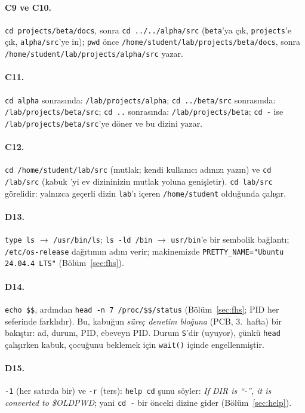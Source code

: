 \documentclass[11pt,a4paper]{article}
\newcommand{\cmd}[1]{\texttt{#1}}
\begin{document}
\paragraph{C9 ve C10.} \cmd{cd projects/beta/docs}, sonra \cmd{cd ../../alpha/src} (\texttt{beta}'ya çık, \texttt{projects}'e çık, \texttt{alpha/src}'ye in); \cmd{pwd} önce \texttt{/home/student/lab/projects/beta/docs}, sonra \texttt{/home/student/lab/projects/alpha/src} yazar.

\paragraph{C11.} \cmd{cd alpha} sonrasında: \texttt{\tl/lab/projects/alpha}; \cmd{cd ../beta/src} sonrasında: \texttt{\tl/lab/projects/beta/src}; \cmd{cd ..} sonrasında: \texttt{\tl/lab/projects/beta}; \cmd{cd -} ise \texttt{\tl/lab/projects/beta/src}'ye döner ve bu dizini yazar.

\paragraph{C12.} \cmd{cd /home/student/lab/src} (mutlak; kendi kullanıcı adınızı yazın) ve \cmd{cd \tl/lab/src} (kabuk \texttt{\tl}'yi ev dizininizin mutlak yoluna genişletir). \cmd{cd lab/src} görelidir: yalnızca geçerli dizin \texttt{lab}'ı içeren \texttt{/home/student} olduğunda çalışır.

\paragraph{D13.} \cmd{type ls} $\to$ \texttt{/usr/bin/ls}; \cmd{ls -ld /bin} $\to$ \texttt{usr/bin}'e bir sembolik bağlantı; \texttt{/etc/os-release} dağıtımın adını verir; makinemizde \texttt{PRETTY\_NAME="Ubuntu 24.04.4 LTS"} (Bölüm~\ref{sec:fhs}).

\paragraph{D14.} \cmd{echo \$\$}, ardından \cmd{head -n 7 /proc/\$\$/status} (Bölüm~\ref{sec:fhs}; PID her seferinde farklıdır). Bu, kabuğun \emph{süreç denetim bloğuna} (PCB, 3.\ hafta) bir bakıştır: ad, durum, PID, ebeveyn PID. Durum \texttt{S}'dir (uyuyor), çünkü \cmd{head} çalışırken kabuk, çocuğunu beklemek için \texttt{wait()} içinde engellenmiştir.

\paragraph{D15.} \cmd{-1} (her satırda bir) ve \cmd{-r} (ters):
\cmd{help cd} şunu söyler: \emph{If DIR is ``-'', it is converted to \$OLDPWD}; yani \cmd{cd -} bir önceki dizine gider (Bölüm~\ref{sec:help}).
\end{document}

